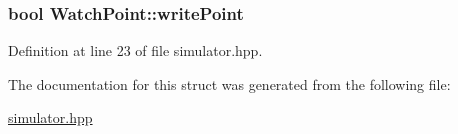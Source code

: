 \hypertarget{struct_watch_point_ace0077dc7681695fdb7fbc3e44637038}{
\subsubsection[{write\-Point}]{\setlength{\rightskip}{0pt plus 5cm}bool Watch\-Point\-::write\-Point}}\label{struct_watch_point_ace0077dc7681695fdb7fbc3e44637038}


Definition at line 23 of file simulator.\-hpp.



The documentation for this struct was generated from the following file\-:\begin{DoxyCompactItemize}
\item 
\hyperlink{simulator_8hpp}{simulator.\-hpp}\end{DoxyCompactItemize}
